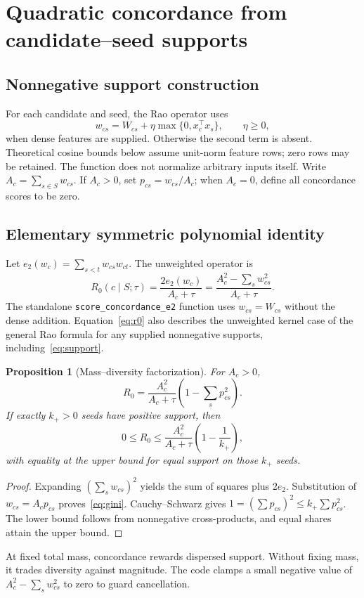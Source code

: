 \documentclass[11pt,a4paper]{article}
\newtheorem{proposition}[theorem]{Proposition}
\theoremstyle{remark}
\newcommand{\code}[1]{\texttt{\small #1}}
\begin{document}
\section{Quadratic concordance from candidate--seed supports}
\subsection{Nonnegative support construction}
For each candidate and seed, the Rao operator uses
\begin{equation}
 w_{cs}=W_{cs}+\eta\max\{0,x_c^\top x_s\},\qquad \eta\geq0,
 \label{eq:support}
\end{equation}
when dense features are supplied. Otherwise the second term is absent.
Theoretical cosine bounds below assume unit-norm feature rows; zero rows
may be retained. The function does not normalize arbitrary inputs itself.
Write $A_c=\sum_{s\in S}w_{cs}$. If $A_c>0$, set $p_{cs}=w_{cs}/A_c$;
when $A_c=0$, define all concordance scores to be zero.

\subsection{Elementary symmetric polynomial identity}
Let $e_2(w_c)=\sum_{s<t}w_{cs}w_{ct}$. The unweighted operator is
\begin{equation}
 R_0(c\mid S;\tau)=\frac{2e_2(w_c)}{A_c+\tau}
 =\frac{A_c^2-\sum_s w_{cs}^2}{A_c+\tau}.
 \label{eq:r0}
\end{equation}
The standalone \code{score\_concordance\_e2} function uses $w_{cs}=W_{cs}$
without the dense addition. Equation~\eqref{eq:r0} also describes the
unweighted kernel case of the general Rao formula for any supplied
nonnegative supports, including~\eqref{eq:support}.
\begin{proposition}[Mass--diversity factorization]
For $A_c>0$,
\begin{equation}
 R_0=\frac{A_c^2}{A_c+\tau}
       \left(1-\sum_s p_{cs}^2\right).
 \label{eq:gini}
\end{equation}
If exactly $k_+>0$ seeds have positive support, then
\begin{equation}
 0\leq R_0\leq\frac{A_c^2}{A_c+\tau}\left(1-\frac1{k_+}\right),
 \label{eq:r0bound}
\end{equation}
with equality at the upper bound for equal support on those $k_+$ seeds.
\end{proposition}
\begin{proof}
Expanding $(\sum_s w_{cs})^2$ yields the sum of squares plus $2e_2$.
Substitution of $w_{cs}=A_cp_{cs}$ proves~\eqref{eq:gini}.
Cauchy--Schwarz gives $1=(\sum p_{cs})^2\leq k_+\sum p_{cs}^2$.
The lower bound follows from nonnegative cross-products, and equal shares
attain the upper bound.
\end{proof}
At fixed total mass, concordance rewards dispersed support. Without fixing
mass, it trades diversity against magnitude. The code clamps a small
negative value of $A_c^2-\sum_s w_{cs}^2$ to zero to guard cancellation.
\end{document}

